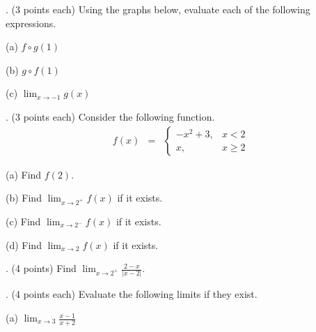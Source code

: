 \documentclass{article}
\begin{document}
{\pagebreak

.  (3 points each)  Using the graphs below, evaluate each of the following expressions.

\vspace{.3cm}

(a) $f\circ g(1)$

\vspace{.5cm}

(b) $g\circ f(1)$

\vspace{.5cm}

(c) $\displaystyle{\lim_{x\rightarrow -1}g(x)}$

\vspace{.5 cm}

\pagebreak

.  (3 points each) Consider the following function.
\begin{eqnarray*}
f(x)&=&\begin{cases} -x^2+3, & x<2\\
x, & x \geq 2\end{cases}
\end{eqnarray*}

\vspace{.3 cm}

(a) Find $f(2)$.

\vspace{2.5cm}

(b) Find $\displaystyle{\lim_{x \rightarrow 2^+}f(x)}$ if it exists.

\vspace{2.5cm}

(c) Find $\displaystyle{\lim_{x \rightarrow 2^-}f(x)}$ if it exists.

\vspace{2.5cm}

(d) Find $\displaystyle{\lim_{x \rightarrow 2}f(x)}$ if it exists.

\vspace{3 cm}

.  (4 points) Find $\displaystyle{\lim_{x\rightarrow 2^+}\frac{2-x}{\left|x-2\right|}}$.

\vspace{.3cm}

\pagebreak

.  (4 points each) Evaluate the following limits if they exist.

\vspace{.3 cm}

(a)  $\displaystyle{\lim_{x\rightarrow 3} \frac{x-1}{x+2}}$

}
\end{document}
